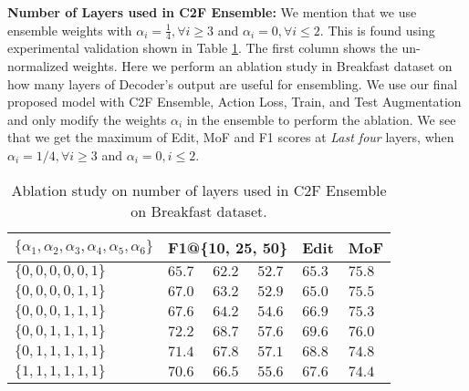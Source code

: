 \documentclass[10pt,twocolumn,letterpaper]{article}
\begin{document}
\textbf{Number of Layers used in C2F Ensemble:}
We mention that we use ensemble weights with $\alpha_i= \frac{1}{4}, \forall i \geq 3$ and $\alpha_i = 0, \forall i \le 2$. This is found using experimental validation shown in Table \ref{tab:weights_experiment}. The first column shows the un-normalized weights. Here we perform an ablation study in Breakfast dataset on how many layers of Decoder's output are useful for ensembling. We use our final proposed model with C2F Ensemble, Action Loss, Train, and Test Augmentation and only modify the weights $\alpha_i$ in the ensemble to perform the ablation. We see that we get the maximum of Edit, MoF and F1 scores at \textit{Last four} layers, \ie when $\alpha_i=1/4, \forall i \geq 3$ and $\alpha_i=0, i \leq 2$.


\begin{table}[]
    \centering
    \begin{tabular}{|p{3.3cm}|p{0.5cm}p{0.5cm}p{0.5cm}p{0.5cm}p{0.6cm}|}
    \hline
         $\{\alpha_1, \alpha_2, \alpha_3, \alpha_4, \alpha_5, \alpha_6\}$ & \multicolumn{3}{c}{F1@\{10, 25, 50\}} & Edit & MoF \\
         \hline\hline
         $\{0, 0, 0, 0, 0, 1\}$ & $65.7$ & $62.2$ & $52.7$ & $65.3$ & $75.8$\\\hline
         $\{0, 0, 0, 0, 1, 1\}$ & $67.0$ & $63.2$ & $52.9$ & $65.0$ & $75.5$\\\hline
         $\{0, 0, 0, 1, 1, 1\}$ & $67.6$ & $64.2$ & $54.6$ & $66.9$ & $75.3$\\\hline
         $\{0, 0, 1, 1, 1, 1\}$ & $\mathbf{72.2}$ & $\mathbf{68.7}$ & $\mathbf{57.6}$ & $\mathbf{69.6}$ & $\mathbf{76.0}$\\\hline
         $\{0, 1, 1, 1, 1, 1\}$ & $71.4$ & $67.8$ & $57.1$ & $68.8$ & $74.8$\\\hline
         $\{1, 1, 1, 1, 1, 1\}$ & $70.6$ & $66.5$ & $55.6$ & $67.6$ & $74.4$ \\\hline
    \end{tabular}
    \caption{Ablation study on number of layers used in C2F Ensemble on Breakfast dataset.}
    \label{tab:weights_experiment}
\end{table}
\end{document}
